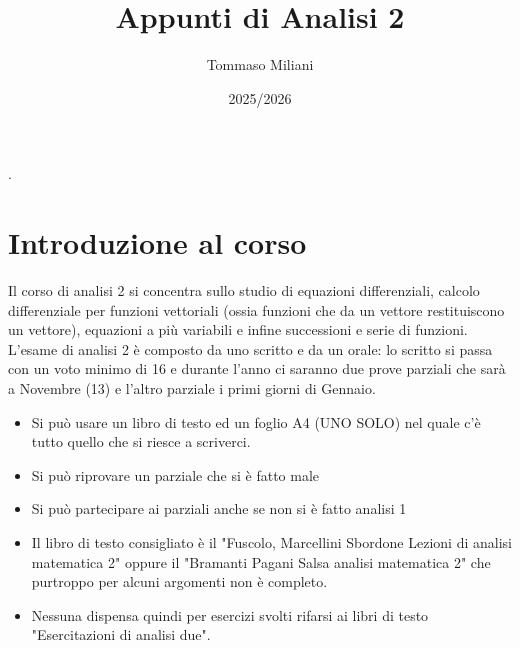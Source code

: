 \documentclass[a4paper, oneside]{book}
\title{Appunti di Analisi 2}
\author{Tommaso Miliani}
\date{2025/2026}
\begin{document}
                {}          %
                {}          %
                {\slshape}  %
                {}          %
                {\bfseries} %
                {.}         %
                {\newline}         %
                {}          %
\theoremstyle{theoremEnv}

\newtheorem{definition}{Definizione}[chapter]
\newtheorem{theorem}{Teorema}[chapter]
\newtheorem{lemma}{Proposizione}[chapter]
\newtheorem{observation}{Osservazione}[chapter]
\newtheorem{corollary}{Corollario}[theorem]
\newtheorem{example}{Esempio}[chapter]

\maketitle

\tableofcontents

\chapter*{Introduzione al corso}
Il corso di analisi 2 si concentra sullo studio di equazioni differenziali, 
calcolo differenziale per funzioni vettoriali (ossia funzioni che
da un vettore restituiscono un vettore), equazioni a più variabili e
infine successioni e serie di funzioni. \\
L'esame di analisi 2 è composto da uno scritto e da un orale:
lo scritto si passa con un voto minimo di 16 e durante l'anno ci saranno
due prove parziali che sarà a Novembre (13) e l'altro parziale i primi giorni
di Gennaio. 
\begin{itemize}
    \item Si può usare un libro di testo ed un foglio A4 (UNO SOLO) nel quale
    c'è tutto quello che si riesce a scriverci.
    \item Si può riprovare un parziale che si è fatto male 
    \item Si può partecipare ai parziali anche se non si è fatto analisi 1
    \item Il libro di testo consigliato è il "Fuscolo, Marcellini Sbordone Lezioni di analisi matematica 2"
    oppure il "Bramanti Pagani Salsa analisi matematica 2" che purtroppo per alcuni argomenti non è completo.
    \item Nessuna dispensa quindi per esercizi svolti rifarsi ai libri di testo "Esercitazioni di analisi due". 
\end{itemize}
\end{document}

